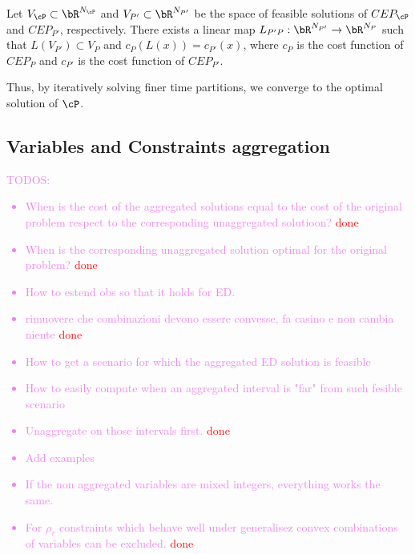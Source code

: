 {\begin{observation}
Let \(V_{\cP} \subset \bR^{N_{\cP}}\) and \(V_{P'} \subset \bR^{N_{P'}}\) be the space of feasible solutions of \(CEP_{\cP}\) and \(CEP_{P'}\), respectively. There exists a linear map \(L_{P'P}: \bR^{N_{P'}} \to \bR^{N_{P}}\) such that \(L(V_{P'}) \subset V_{P}\) and \(c_{P}(L(x)) = c_{P'}(x)\), where \(c_{P}\) is the cost function of \(CEP_{P}\) and \(c_{P'}\) is the cost function of \(CEP_{P'}\).
\end{observation}

Thus, by iteratively solving finer time partitions, we converge to the optimal solution of \(\cP\).}
\subsection{Variables and Constraints aggregation}
\textcolor{violet}{
TODOS:
\begin{itemize}
  \item When is the cost of the aggregated solutions equal to the cost of the original problem respect to the corresponding unaggregated solutioon? \textcolor{red}{done}
  \item When is the corresponding unaggregated solution optimal for the original problem? \textcolor{red}{done}
  \item How to estend obs so that it holds for ED. 
  \item rimuovere che combinazioni devono essere convesse, fa casino e non cambia niente \textcolor{red}{done}
  \item How to get a scenario for which the aggregated ED solution is feasible 
  \item How to easily compute when an aggregated interval is "far" from such fesible scenario
  \item Unaggregate on those intervals first. \textcolor{red}{done}
  \item Add examples
  \item If the non aggregated variables are mixed integers, everything works the same.
  \item For \(\rho_r\) constraints which behave well under generalisez convex combinations of variables can be excluded. \textcolor{red}{done}
\end{itemize}
}


